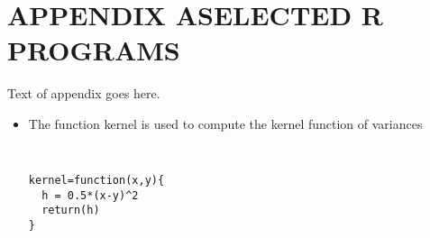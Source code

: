 \chapter{\texorpdfstring{APPENDIX A\hspace{1em}SELECTED R PROGRAMS}{APPENDIX A}}

Text of appendix goes here.

\begin{itemize}
\item The function kernel is used to compute the kernel function of variances
{\small \tt
\begin{verbatim}
kernel=function(x,y){
  h = 0.5*(x-y)^2
  return(h)
}
\end{verbatim}
}
\end{itemize}


\pagebreak  %

